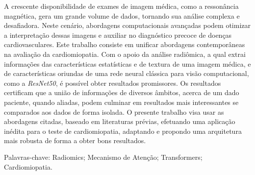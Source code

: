 
\begin{resumo}
\setlength{\baselineskip}{1.5\baselineskip} %

A crescente disponibilidade de exames de imagem médica, como a ressonância magnética, gera um grande volume de dados, tornando sua análise complexa e desafiadora. Neste cenário, abordagens computacionais avançadas podem otimizar a interpretação dessas imagens e auxiliar no diagnóstico precoce de doenças cardiovasculares. Este trabalho consiste em unificar abordagens contemporâneas na avaliação da cardiomiopatia. Com o apoio da análise radiômica, a qual extrai informações das características estatísticas e de textura de uma imagem médica, e de características oriundas de uma rede neural clássica para visão computacional, como a \textit{ResNet50}, é possível obter resultados promissores. Os resultados certificam que a união de informações de diversos âmbitos, acerca de um dado paciente, quando aliadas, podem culminar em resultados mais interessantes se comparados aos dados de forma isolada. O presente trabalho visa usar as abordagens citadas, baseado em literaturas prévias, efetuando uma aplicação inédita para o teste de cardiomiopatia, adaptando e propondo uma arquitetura mais robusta de forma a obter bons resultados.

\vspace{\onelineskip}
\noindent
Palavras-chave: Radiomics; Mecanismo de Atenção; Transformers; Cardiomiopatia.

\end{resumo}